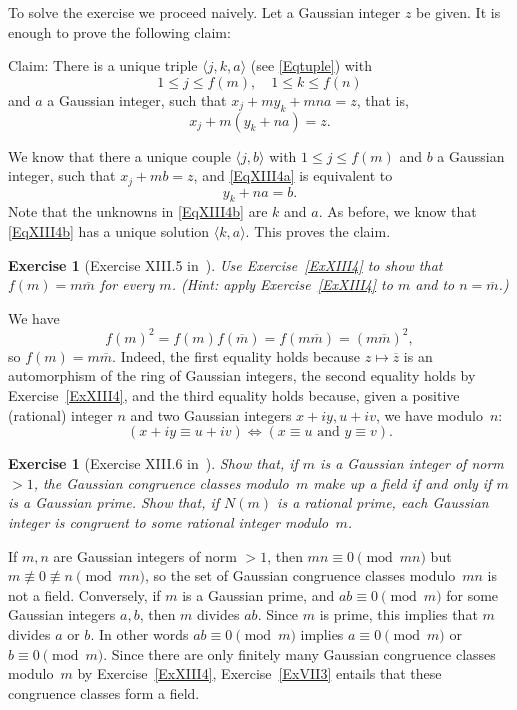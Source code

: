 \documentclass[12pt,letterpaper]{article}
\newtheorem{exer}[thm]{Exercise}
\theoremstyle{definition}
\begin{document}
To solve the exercise we proceed naively. Let a Gaussian integer $z$ be given. It is enough to prove the following claim: 

Claim: There is a unique triple $\langle j,k,a\rangle$ (see \eqref{Eqtuple}) with 
$$
1\le j\le f(m),\quad 1\le k\le f(n)
$$ 
and $a$ a Gaussian integer, such that $x_j+my_k+mna=z$, that is, 
\begin{equation}\label{EqXIII4a} 
x_j+m(y_k+na)=z.
\end{equation} 

We know that there a unique couple $\langle j,b\rangle$ with $1\le j\le f(m)$ and $b$ a Gaussian integer, such that $x_j+mb=z$, and \eqref{EqXIII4a} is equivalent to 
\begin{equation}\label{EqXIII4b} 
y_k+na=b.
\end{equation} 
Note that the unknowns in \eqref{EqXIII4b} are $k$ and $a$. As before, we know that \eqref{EqXIII4b} has a unique solution $\langle k,a\rangle$. This proves the claim. 

\begin{exer}[Exercise XIII.5 in~\cite{weil1979}]\label{ExXIII5}
Use Exercise~\ref{ExXIII4} to show that $f(m)=m\overline{m}$ for every $m$. (Hint: apply Exercise~\ref{ExXIII4} to $m$ and to $n=\overline{m}$.) 
\end{exer}

We have 
$$
f(m)^2=f(m)f(\overline{m})=f(m\overline{m})=(m\overline{m})^2,
$$ 
so $f(m)=m\overline{m}$. Indeed, the first equality holds because $z\mapsto\overline{z}$ is an automorphism of the ring of Gaussian integers, the second equality holds by Exercise~\ref{ExXIII4}, and the third equality holds because, given a positive (rational) integer $n$ and two Gaussian integers $x+iy, u+iv$, we have modulo~$n$: 
$$
(x+iy \equiv u+iv) \iff (x \equiv u \text{ and } y \equiv v).
$$ 

\begin{exer}[Exercise XIII.6 in~\cite{weil1979}]
Show that, if $m$ is a Gaussian integer of norm $>1$, the Gaussian congruence classes modulo~$m$ make up a field if and only if $m$ is a Gaussian prime. Show that, if $N(m)$ is a rational prime, each Gaussian integer is congruent to some rational integer modulo~$m$.
\end{exer}

If $m,n$ are Gaussian integers of norm $>1$, then $mn\equiv0\pmod{mn}$ but $m\not\equiv0\not\equiv n\pmod{mn}$, so the set of Gaussian congruence classes modulo~$mn$ is not a field. Conversely, if $m$ is a Gaussian prime, and $ab\equiv0\pmod{m}$ for some Gaussian integers $a,b$, then $m$ divides $ab$. Since $m$ is prime, this implies that $m$ divides $a$ or $b$. In other words $ab\equiv0\pmod{m}$ implies $a\equiv0\pmod{m}$ or $b\equiv0\pmod{m}$. Since there are only finitely many Gaussian congruence classes modulo~$m$ by Exercise~\ref{ExXIII4}, Exercise~\ref{ExVII3} entails that these congruence classes form a field. 
\end{document}
